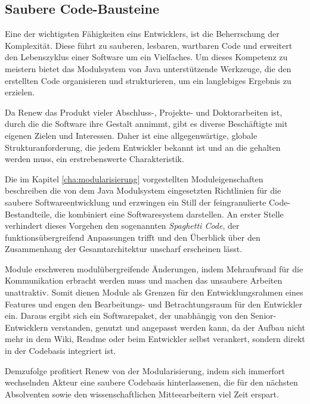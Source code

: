 \subsection{Saubere Code-Bausteine}\label{sub:scbs}

Eine der wichtigsten Fähigkeiten eins Entwicklers, ist die Beherrschung der Komplexität. Diese führt zu sauberen, lesbaren, wartbaren Code und erweitert den Lebenszyklus einer Software um ein Vielfaches. Um dieses Kompetenz zu meistern bietet das Modulsystem von Java unterstützende Werkzeuge, die den erstellten Code organisieren und strukturieren, um ein langlebiges Ergebnis zu erzielen. 


Da Renew das Produkt vieler Abschluss-, Projekte- und Doktorarbeiten ist, durch die die Software ihre Gestalt annimmt, gibt es diverse Beschäftigte mit eigenen Zielen und Interessen. Daher ist eine allgegenwärtige, globale Strukturanforderung, die jedem Entwickler bekannt ist und an die gehalten werden muss, ein erstrebenswerte Charakteristik. 


Die im Kapitel \ref{cha:modularisierung} vorgestellten Moduleigenschaften beschreiben die von dem Java Modulsystem eingesetzten Richtlinien für die saubere Softwareentwicklung und erzwingen ein Still der feingranulierte Code-Bestandteile, die kombiniert eine Softwaresystem darstellen. An erster Stelle verhindert dieses Vorgehen den sogenannten \textit{Spaghetti Code}, der funktionsübergreifend Anpassungen trifft und den Überblick über den Zusammenhang der Gesamtarchitektur unscharf erscheinen lässt. 


Module erschweren modulübergreifende Änderungen, indem Mehraufwand für die Kommunikation erbracht werden muss und machen das unsaubere Arbeiten unattraktiv. Somit dienen Module als Grenzen für den Entwicklungsrahmen eines Features und engen den Bearbeitungs- und Betrachtungsraum für den Entwickler ein. Daraus ergibt sich ein Softwarepaket, der unabhängig von den Senior-Entwicklern verstanden, genutzt und angepasst werden kann, da der Aufbau nicht mehr in dem Wiki, Readme oder beim Entwickler selbst verankert, sondern direkt in der Codebasis integriert ist. 


Demzufolge profitiert Renew von der Modularisierung, indem sich immerfort wechselnden Akteur eine saubere Codebasis hinterlassenen, die für den nächsten Absolventen sowie den wissenschaftlichen Mitteearbeitern viel Zeit erspart. \bigbreak


